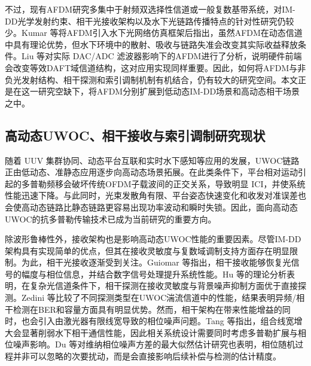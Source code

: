 不过，现有AFDM研究多集中于射频双选择性信道或一般复数基带系统，对IM-DD光学发射约束、相干光接收架构以及水下光链路传播特点的针对性研究仍较少。Kumar 等将AFDM引入水下光网络仿真框架后指出，虽然AFDM在动态信道中具有理论优势，但水下环境中的散射、吸收与链路失准会改变其实际收益释放条件\cite{kumar2025optical_network}。Liu 等对实际 DAC/ADC 滤波器影响下的AFDM进行了分析，说明硬件前端会改变等效DAFT域信道结构，这对应用实现同样重要\cite{liu2025affine_dac}。因此，如何将AFDM与非负光发射结构、相干探测和索引调制机制有机结合，仍有较大的研究空间。本文正是在这一研究空缺下，将AFDM分别扩展到低动态IM-DD场景和高动态相干场景之中。

\subsection{高动态UWOC、相干接收与索引调制研究现状}
\label{subsec:status_coherent}

随着 UUV 集群协同、动态平台互联和实时水下感知等应用的发展，UWOC链路正由低动态、准静态应用逐步向高动态场景拓展\cite{MianXiangUUVJiQunYingYongDeShuiXiaWuXianGuangTongXinGuanJianJiShu2025}。在此类条件下，平台相对运动引起的多普勒频移会破坏传统OFDM子载波间的正交关系，导致明显 ICI，并使系统性能迅速下降\cite{zhuDopplerResistantOrthogonalChirp2022, fernandesDigitallyMitigatingDoppler2023}。与此同时，光束发散角有限、平台姿态快速变化和收发对准误差也会使高动态链路比静态链路更容易出现功率波动和瞬时失锁\cite{hoeherUnderwaterOpticalWireless2021, derakhshandehUnderwaterCoherentOptical2025}。因此，面向高动态UWOC的抗多普勒传输技术已成为当前研究的重要方向。

除波形鲁棒性外，接收架构也是影响高动态UWOC性能的重要因素。尽管IM-DD架构具有实现简单的优点，但其在接收灵敏度与复数域调制支持方面存在明显限制。为此，相干光接收逐渐受到关注。Guiomar 等指出，相干接收能够恢复光信号的幅度与相位信息，并结合数字信号处理提升系统性能\cite{guiomarCoherentFreeSpaceOptical2022}。Hu 等的理论分析表明，在复杂光信道条件下，相干探测在接收灵敏度与背景噪声抑制方面优于直接探测\cite{huPerformanceCoherentOptical2025}。Zedini 等比较了不同探测类型在UWOC湍流信道中的性能，结果表明异频/相干检测在BER和容量方面具有明显优势\cite{zediniEvaluationUnderwaterOptical2025}。然而，相干架构在带来性能增益的同时，也会引入由激光器有限线宽导致的相位噪声问题。Tang 等指出，组合线宽增大会显著削弱水下相干通信性能，因此相关系统设计需要同时考虑多普勒扩展与相位噪声影响\cite{tangUnderwaterCoherentOptical2021}。Du 等对维纳相位噪声方差的最大似然估计研究也表明，相位随机过程并非可以忽略的次要扰动，而是会直接影响后续补偿与检测的估计精度\cite{du2024maximum}。

